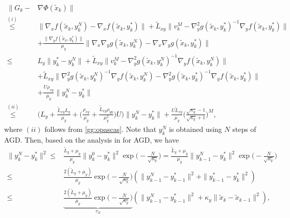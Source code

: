 \documentclass{osudissert96}
\begin{document}
\begin{align}\label{jingyisang}
\|G_k-&\nabla \Phi(\widetilde x_k)\| \nonumber
\\\overset{(i)}\leq & \| \nabla_x f( \widetilde x_k,y_k^N) -\nabla_x f(\widetilde x_k,y^*_k)\| + \widetilde L_{xy}\|v_k^M- \nabla_y^2 g(\widetilde x_k,y^*_k)^{-1}\nabla_y f(\widetilde x_k,y^*_k) \|  \nonumber
\\&+\frac{\|\nabla_y f(\widetilde  x_k,y^*_k) \|}{\mu_y}  \|\nabla_x \nabla_y g(\widetilde  x_k,y_k^N)-\nabla_x \nabla_y g(\widetilde x_k,y^*_k)\| \nonumber
\\\leq & L_y \|y^*_k-y_k^N\| + \widetilde L_{xy} \|v_k^M- \nabla_y^2 g(\widetilde x_k,y_k^N)^{-1}\nabla_y f(\widetilde x_k,y^N_k) \| \nonumber
\\&+ \widetilde L_{xy}\big\|\nabla_y^2 g(\widetilde x_k,y_k^N)^{-1}\nabla_y f(\widetilde x_k,y^N_k)-\nabla_y^2 g(\widetilde x_k,y^*_k)^{-1}\nabla_y f(\widetilde x_k,y^*_k) \big\| \nonumber
\\&+\frac{U\rho_{xy}}{\mu_y} \|y_k^N-y^*_k\| \nonumber
\\\overset{(ii)}\leq&\Big(L_y +\frac{\widetilde L_{xy}L_y}{\mu_y} +\Big(\frac{\rho_{xy}}{\mu_y}+\frac{\widetilde L_{xy}\rho_{yy}}{\mu_y^2}\Big)U\Big)\|y_k^N-y^*_k\| + \frac{U\widetilde L_{xy}}{\mu_y}\Big(\frac{\sqrt{\kappa_y}-1}{\sqrt{\kappa_y}+1}\Big)^M,
\end{align}
where $(ii)$ follows from \cref{gg:opascas}. Note that $y_k^N$ is obtained using $N$ steps of AGD. Then, based on the analysis in \cite{nesterov2003introductory} for AGD, we have 
\begin{align}\label{eq:taun}
\|y_k^N-y_k^*\|^2\leq & \frac{\widetilde L_y +\mu_y}{\mu_y} \|y_k^0-y^*_k\|^2 \exp\big(-\frac{N}{\sqrt{\kappa_y}}\big) =  \frac{\widetilde L_y +\mu_y}{\mu_y} \|y_{k-1}^N-y^*_k\|^2 \exp\big(-\frac{N}{\sqrt{\kappa_y}}\big) \nonumber
\\\leq &\frac{2(\widetilde L_y +\mu_y)}{\mu_y} \exp\Big(-\frac{N}{\sqrt{\kappa_y}}\Big) (\|y_{k-1}^N-y_{k-1}^*\|^2 + \|y_{k-1}^*-y_k^*\|^2) \nonumber
\\\leq &\underbrace{\frac{2(\widetilde L_y +\mu_y)}{\mu_y} \exp\Big(-\frac{N}{\sqrt{\kappa_y}}\Big) }_{\tau_N}(\|y_{k-1}^N-y_{k-1}^*\|^2 + \kappa_y\|\widetilde x_k - \widetilde x_{k-1}\|^2),
\end{align}
\end{document}
